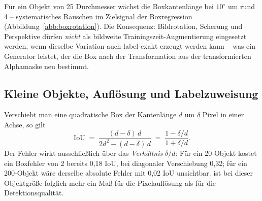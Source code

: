 Für ein Objekt von 25\px{} Durchmesser wächst die Boxkantenlänge bei $10^\circ$
um rund 4\px{} -- systematisches Rauschen im Zielsignal der Boxregression
(Abbildung~\ref{abb:boxrotation}). Die Konsequenz: Bildrotation, Scherung und Perspektive dürfen \emph{nicht} als
bildweite Trainingszeit-Augmentierung eingesetzt werden, wenn dieselbe Variation
auch label-exakt erzeugt werden kann -- was ein Generator leistet, der die Box
nach der Transformation aus der transformierten Alphamaske neu bestimmt.

\subsection{Kleine Objekte, Auflösung und Labelzuweisung}
\label{sec:ioukleinobjekt}

Verschiebt man eine quadratische Box der Kantenlänge $d$ um $\delta$ Pixel in
einer Achse, so gilt
\begin{equation}
\mathrm{IoU} \;=\; \frac{(d-\delta)\,d}{2d^2 - (d-\delta)\,d}
\;=\; \frac{1 - \delta/d}{1 + \delta/d} .
\label{eq:ioushift}
\end{equation}
Der Fehler wirkt ausschließlich über das \emph{Verhältnis} $\delta/d$: Für ein
20\px-Objekt kostet ein Boxfehler von 2\px{} bereits 0,18 IoU, bei diagonaler
Verschiebung 0,32; für ein 200\px-Objekt wäre derselbe absolute Fehler mit 0,02
IoU unsichtbar. \mAPall{} ist bei dieser Objektgröße folglich mehr ein Maß für
die Pixelauflösung als für die Detektionsqualität.

